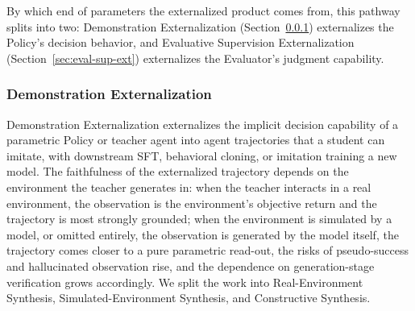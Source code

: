 By which end of parameters the externalized product comes from, this pathway splits into two: Demonstration Externalization (Section~\ref{sec:demo-ext}) externalizes the Policy's decision behavior, and Evaluative Supervision Externalization (Section~\ref{sec:eval-sup-ext}) externalizes the Evaluator's judgment capability.

\subsubsection{Demonstration Externalization}
\label{sec:demo-ext}

Demonstration Externalization externalizes the implicit decision capability of a parametric Policy or teacher agent into agent trajectories that a student can imitate, with downstream SFT, behavioral cloning, or imitation training a new model. The faithfulness of the externalized trajectory depends on the environment the teacher generates in: when the teacher interacts in a real environment, the observation is the environment's objective return and the trajectory is most strongly grounded; when the environment is simulated by a model, or omitted entirely, the observation is generated by the model itself, the trajectory comes closer to a pure parametric read-out, the risks of pseudo-success and hallucinated observation rise, and the dependence on generation-stage verification grows accordingly. We split the work into Real-Environment Synthesis, Simulated-Environment Synthesis, and Constructive Synthesis.

